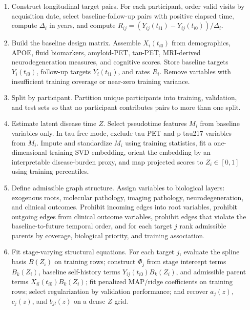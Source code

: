 \begin{enumerate}
\item Construct longitudinal target pairs. For each participant, order valid
visits by acquisition date, select baseline-follow-up pairs with positive
elapsed time, compute $\Delta_i$ in years, and compute
$R_{ij}=(Y_{ij}(t_{i1})-Y_{ij}(t_{i0}))/\Delta_i$.

\item Build the baseline design matrix. Assemble $X_i(t_{i0})$ from
demographics, APOE, fluid biomarkers, amyloid-PET, tau-PET, MRI-derived
neurodegeneration measures, and cognitive scores. Store baseline targets
$Y_i(t_{i0})$, follow-up targets $Y_i(t_{i1})$, and rates $R_i$. Remove
variables with insufficient training coverage or near-zero training variance.

\item Split by participant. Partition unique participants into training,
validation, and test sets so that no participant contributes pairs to more
than one split.

\item Estimate latent disease time $Z$. Select pseudotime features $M_i$ from
baseline variables only. In tau-free mode, exclude tau-PET and p-tau217
variables from $M_i$. Impute and standardize $M_i$ using training statistics,
fit a one-dimensional training SVD embedding, orient the embedding by an
interpretable disease-burden proxy, and map projected scores to $Z_i \in [0,1]$
using training percentiles.

\item Define admissible graph structure. Assign variables to biological layers:
exogenous roots, molecular pathology, imaging pathology, neurodegeneration,
and clinical outcomes. Prohibit incoming edges into root variables, prohibit
outgoing edges from clinical outcome variables, prohibit edges that violate the
baseline-to-future temporal order, and for each target $j$ rank admissible
parents by coverage, biological priority, and training association.

\item Fit stage-varying structural equations. For each target $j$, evaluate
the spline basis $B(Z_i)$ on training rows; construct $\Phi_j$ from stage
intercept terms $B_k(Z_i)$, baseline self-history terms
$Y_{ij}(t_{i0})B_k(Z_i)$, and admissible parent terms
$X_{il}(t_{i0})B_k(Z_i)$; fit penalized MAP/ridge coefficients on training
rows; select regularization by validation performance; and recover
$a_j(z)$, $c_j(z)$, and $b_{jl}(z)$ on a dense $Z$ grid.


\end{enumerate}
